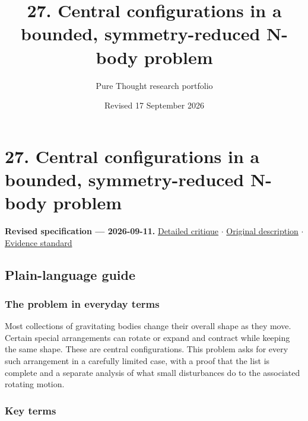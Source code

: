 \documentclass[
  11pt,
]{article}
\title{27. Central configurations in a bounded, symmetry-reduced N-body
problem}
\author{Pure Thought research portfolio}
\date{Revised 17 September 2026}
\begin{document}
\maketitle
\thispagestyle{empty}
\clearpage

\section{27. Central configurations in a bounded, symmetry-reduced
N-body problem}

\textbf{Revised specification --- 2026-09-11.}
\href{https://github.com/rick-stevens-ai/Pure-Thought/blob/main/reviews/27-N-Body-Central-Configurations.md}{Detailed
critique} \ensuremath{\cdot}
\href{https://github.com/rick-stevens-ai/Pure-Thought/blob/main/archive/original-PRDs/27-N-Body-Central-Configurations.md}{Original
description} \ensuremath{\cdot}
\href{https://github.com/rick-stevens-ai/Pure-Thought/blob/main/reviews/EVIDENCE-STANDARD.md}{Evidence
standard}

\subsection{Plain-language guide}

\subsubsection{The problem in everyday terms}

Most collections of gravitating bodies change their overall shape as
they move. Certain special arrangements can rotate or expand and
contract while keeping the same shape. These are central configurations.
This problem asks for every such arrangement in a carefully limited
case, with a proof that the list is complete and a separate analysis of
what small disturbances do to the associated rotating motion.

\subsubsection{Key terms}
\end{document}
